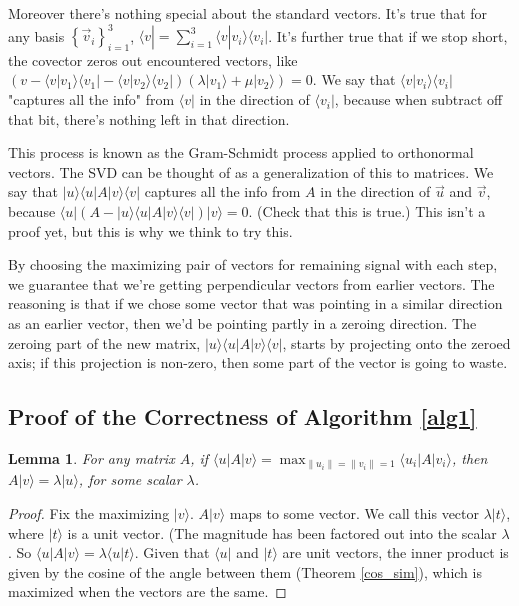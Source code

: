 \documentclass{amsbook}
\newtheorem{lemma}[theorem]{Lemma}
\begin{document}
\begin{tcolorbox}[title=Example: Covector Analogy,colback=blue!5]
Moreover there's nothing special about the standard vectors.  It's true that for any basis $\left\{\vec v _i\right\}_{i=1}^3$, $\langle v| = \sum_{i=1}^3\langle v| v _i\rangle\langle v _i|$.  It's further true that if we stop short, the covector zeros out encountered vectors, like $\left(v-\langle v| v _1\rangle\langle v _1|-\langle v| v _2\rangle\langle v _2|\right)\left(\lambda| v _1\rangle+\mu| v _2\rangle\right)=0$.  We say that $\langle v| v _i\rangle\langle v _i|$ "captures all the info" from $\langle v|$ in the direction of $\langle v _i|$, because when subtract off that bit, there's nothing left in that direction.

This process is known as the Gram-Schmidt process applied to orthonormal vectors.  The SVD can be thought of as a generalization of this to matrices.  We say that $| u \rangle\langle u |A| v \rangle\langle v |$ captures all the info from  $A$ in the direction of $\vec u $ and $\vec v $, because $\langle u |\left(A-| u \rangle\langle u |A| v \rangle\langle v |\right)| v \rangle=0$.  (Check that this is true.)  This isn't a proof yet, but this is why we think to try this.

By choosing the maximizing pair of vectors for remaining signal with each step, we guarantee that we're getting perpendicular vectors from earlier vectors.  The reasoning is that if we chose some vector that was pointing in a similar direction as an earlier vector, then we'd be pointing partly in a zeroing direction.  The zeroing part of the new matrix, $| u \rangle\langle u |A| v \rangle\langle v |$, starts by projecting onto the zeroed axis; if this projection is non-zero, then some part of the vector is going to waste.
\end{tcolorbox}

\subsection{Proof of the Correctness of Algorithm \ref{alg1}}

\begin{lemma}
\label{tollbooth}
For any matrix $A$, if $\langle u |A| v \rangle=\max_{\|u_i\|=\|v_i\|=1}\langle u_i |A| v_i \rangle$, then $A| v \rangle=\lambda| u \rangle$, for some scalar $\lambda$.
\end{lemma}

\begin{proof}
Fix the maximizing $|v\rangle$.  $A| v \rangle$ maps to some vector.  We call this vector $\lambda|t\rangle$, where $|t\rangle$ is a unit vector.  (The magnitude has been factored out into the scalar $\lambda$.  So $\langle u |A| v \rangle=\lambda\langle u | t\rangle$.  Given that $\langle u |$ and $| t\rangle$ are unit vectors, the inner product is given by the cosine of the angle between them (Theorem \ref{cos_sim}), which is maximized when the vectors are the same.
\end{proof}
\end{document}
